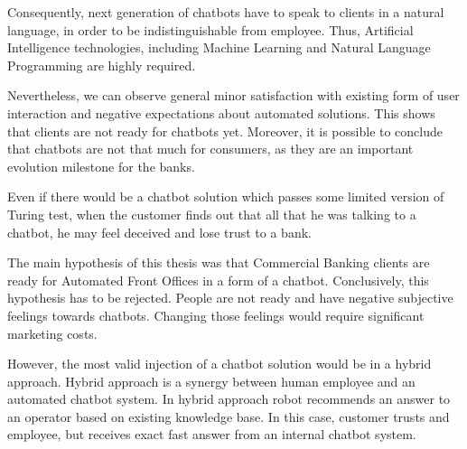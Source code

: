 Consequently, next generation of chatbots have to speak to clients in a natural language, in order to be indistinguishable from employee.
Thus, Artificial Intelligence technologies, including Machine Learning and Natural Language Programming are highly required.

Nevertheless, we can observe general minor satisfaction with existing form of user interaction and negative expectations about automated solutions.
This shows that clients are not ready for chatbots yet.
Moreover, it is possible to conclude that chatbots are not that much for consumers, as they are an important evolution milestone for the banks.

Even if there would be a chatbot solution which passes some limited version of Turing test, when the customer finds
out that all that he was talking to a chatbot, he may feel deceived and lose trust to a bank.

The main hypothesis of this thesis was that Commercial Banking clients are ready for Automated Front Offices in a form of a chatbot.
Conclusively, this hypothesis has to be rejected.
People are not ready and have negative subjective feelings towards chatbots.
Changing those feelings would require significant marketing costs.

However, the most valid injection of a chatbot solution would be in a hybrid approach.
Hybrid approach is a synergy between human employee and an automated chatbot system.
In hybrid approach robot recommends an answer to an operator based on existing knowledge base.
In this case, customer trusts and employee, but receives exact fast answer from an internal chatbot system.